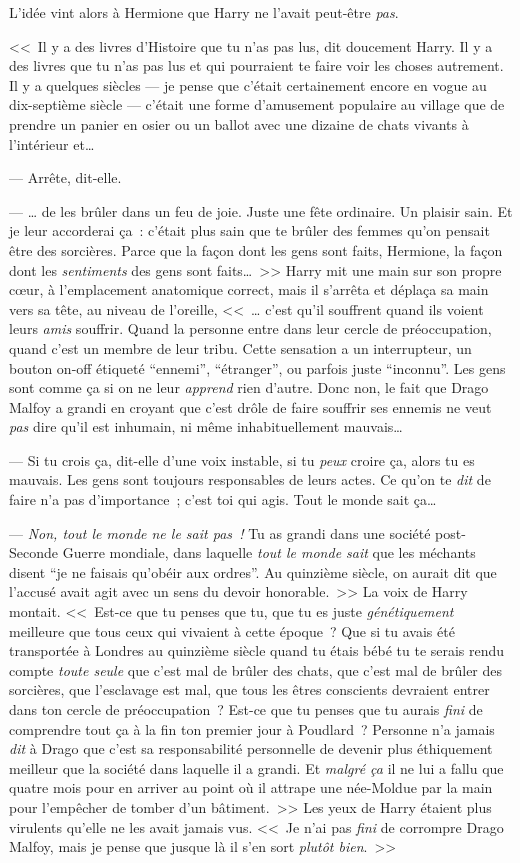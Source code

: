 L'idée vint alors à Hermione que Harry ne l'avait peut-être \emph{pas}.

<<~Il y a des livres d'Histoire que tu n'as pas lus, dit doucement Harry. Il y a des livres que tu n'as pas lus et qui pourraient te faire voir les choses autrement. Il y a quelques siècles — je pense que c'était certainement encore en vogue au dix-septième siècle — c'était une forme d'amusement populaire au village que de prendre un panier en osier ou un ballot avec une dizaine de chats vivants à l'intérieur et…

--- Arrête, dit-elle.

--- … de les brûler dans un feu de joie. Juste une fête ordinaire. Un plaisir sain. Et je leur accorderai ça~: c'était plus sain que te brûler des femmes qu'on pensait être des sorcières. Parce que la façon dont les gens sont faits, Hermione, la façon dont les \emph{sentiments} des gens sont faits…~>> Harry mit une main sur son propre cœur, à l'emplacement anatomique correct, mais il s'arrêta et déplaça sa main vers sa tête, au niveau de l'oreille, <<~… c'est qu'il souffrent quand ils voient leurs \emph{amis} souffrir. Quand la personne entre dans leur cercle de préoccupation, quand c'est un membre de leur tribu. Cette sensation a un interrupteur, un bouton on-off étiqueté “ennemi”, “étranger”, ou parfois juste “inconnu”. Les gens sont comme ça si on ne leur \emph{apprend} rien d'autre. Donc non, le fait que Drago Malfoy a grandi en croyant que c'est drôle de faire souffrir ses ennemis ne veut \emph{pas} dire qu'il est inhumain, ni même inhabituellement mauvais…

--- Si tu crois ça, dit-elle d'une voix instable, si tu \emph{peux} croire ça, alors tu es mauvais. Les gens sont toujours responsables de leurs actes. Ce qu'on te \emph{dit} de faire n'a pas d'importance~; c'est toi qui agis. Tout le monde sait ça…

--- \emph{Non, tout le monde ne le sait pas~!} Tu as grandi dans une société post-Seconde Guerre mondiale, dans laquelle \emph{tout le monde sait} que les méchants disent “je ne faisais qu'obéir aux ordres”. Au quinzième siècle, on aurait dit que l'accusé avait agit avec un sens du devoir honorable.~>> La voix de Harry montait. <<~Est-ce que tu penses que tu, que tu es juste \emph{génétiquement} meilleure que tous ceux qui vivaient à cette époque~? Que si tu avais été transportée à Londres au quinzième siècle quand tu étais bébé tu te serais rendu compte \emph{toute seule} que c'est mal de brûler des chats, que c'est mal de brûler des sorcières, que l'esclavage est mal, que tous les êtres conscients devraient entrer dans ton cercle de préoccupation~? Est-ce que tu penses que tu aurais \emph{fini} de comprendre tout ça à la fin ton premier jour à Poudlard~? Personne n'a jamais \emph{dit} à Drago que c'est sa responsabilité personnelle de devenir plus éthiquement meilleur que la société dans laquelle il a grandi. Et \emph{malgré ça} il ne lui a fallu que quatre mois pour en arriver au point où il attrape une née-Moldue par la main pour l'empêcher de tomber d'un bâtiment.~>> Les yeux de Harry étaient plus virulents qu'elle ne les avait jamais vus. <<~Je n'ai pas \emph{fini} de corrompre Drago Malfoy, mais je pense que jusque là il s'en sort \emph{plutôt bien}.~>>

